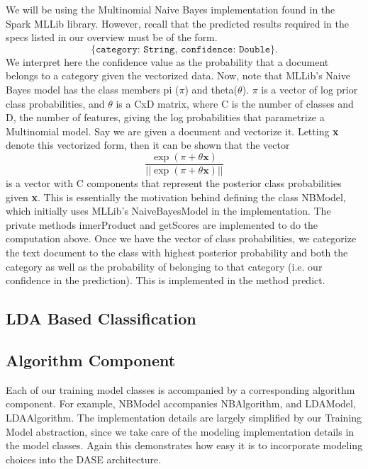 \documentclass[a4paper,12pt]{article}
\renewcommand{\bf}[1]{\textbf{#1}}
\renewcommand{\tt}[1]{\texttt{#1}}
\newcommand{\3}{\left}
\newcommand{\4}{\right}
\renewcommand{\-}[1]{{}^{-#1}}
\begin{document}
We will be using the Multinomial Naive Bayes implementation found in the Spark MLLib library. However, recall that the predicted results required in the specs listed in our overview must be of the form.
$$
\tt{\{category: String, confidence: Double\}}.
$$
We interpret here the confidence value as the probability that a document belongs to a category given the vectorized data. Now, note that MLLib's Naive Bayes model has the class members pi ($\pi$) and theta($\theta$). $\pi$ is a vector of log prior class probabilities, and $\theta$ is a CxD matrix, where C is the number of classes and D, the number of features, giving the log probabilities that parametrize a Multinomial model. Say we are given a document and vectorize it. Letting \bf{x} denote this vectorized form, then it can be shown that the vector 
$$
\frac{\exp\3(\pi + \theta\bf{x}\4)}{||\exp\3(\pi + \theta\bf{x}\4)||}
$$
is a vector with C components that represent the posterior class probabilities given \bf{x}. This is essentially the motivation behind defining the class NBModel, which initially uses MLLib's NaiveBayesModel in the implementation. The private methods innerProduct and getScores are implemented to do the computation above. Once we have the vector of class probabilities, we categorize the text document to the class with highest posterior probability and both the category as well as the probability of belonging to that category (i.e. our confidence in the prediction). This is implemented in the method predict.

\subsection*{LDA Based Classification}

\subsection*{Algorithm Component}

Each of our training model classes is accompanied by a corresponding algorithm component. For example, NBModel accompanies NBAlgorithm, and LDAModel, LDAAlgorithm. The implementation details are largely simplified by our Training Model abstraction, since we take care of the modeling implementation details in the model classes. Again this demonstrates how easy it is to incorporate modeling choices into the DASE architecture. 
\end{document}
